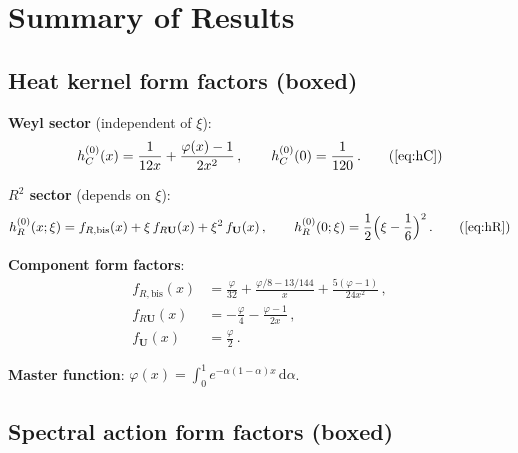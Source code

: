 \documentclass[11pt,a4paper]{article}
\newcommand{\dd}{\mathrm{d}}
\theoremstyle{definition}
\theoremstyle{remark}
\begin{document}
\section{Summary of Results}
\label{sec:summary}

\subsection{Heat kernel form factors (boxed)}

\begin{tcolorbox}[colback=blue!5!white,colframe=blue!50!black,
  title={\textbf{Scalar heat kernel form factors}}]
\textbf{Weyl sector} (independent of $\xi$):
\begin{equation}
  h_C^{(0)}(x)
  = \frac{1}{12x} + \frac{\varphi(x) - 1}{2x^2}\,,
  \qquad h_C^{(0)}(0) = \frac{1}{120}\,.
  \tag{\ref{eq:hC}}
\end{equation}

\textbf{$R^2$ sector} (depends on $\xi$):
\begin{equation}
  h_R^{(0)}(x;\xi)
  = f_{R,\text{bis}}(x)
  + \xi\,f_{R\mathbf{U}}(x) + \xi^2\,f_{\mathbf{U}}(x)\,,
  \qquad h_R^{(0)}(0;\xi) = \frac{1}{2}\Bigl(\xi-\frac{1}{6}\Bigr)^2\,.
  \tag{\ref{eq:hR}}
\end{equation}

\textbf{Component form factors}:
\begin{align*}
  f_{R,\text{bis}}(x) &= \frac{\varphi}{32}
  + \frac{\varphi/8 - 13/144}{x}
  + \frac{5(\varphi-1)}{24x^2}\,,\\[4pt]
  f_{R\mathbf{U}}(x) &= -\frac{\varphi}{4}
  - \frac{\varphi-1}{2x}\,,\\[4pt]
  f_{\mathbf{U}}(x) &= \frac{\varphi}{2}\,.
\end{align*}

\textbf{Master function}:
$\displaystyle\varphi(x) = \int_0^1 e^{-\alpha(1-\alpha)x}\,\dd\alpha$.
\end{tcolorbox}

\subsection{Spectral action form factors (boxed)}
\end{document}
